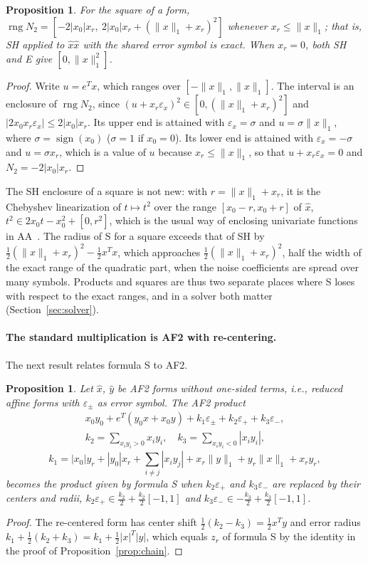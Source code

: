 \documentclass[10pt]{article}
\newtheorem{propo}[theorem]{Proposition}
\theoremstyle{definition}
\newcommand{\eps}{\varepsilon}
\newcommand{\ex}{\eps_x}
\newcommand{\rng}{\operatorname{rng}}
\begin{document}
\begin{propo}
\label{prop:square}
For the square of a form, $\rng N_2 = [-2|x_0|x_r,\ 2|x_0|x_r+(\|x\|_1+x_r)^2]$ whenever $x_r\le\|x\|_1$; that is, SH applied to $\hat x\hat x$ with the shared error symbol is exact. When $x_r=0$, both SH and E give $[0,\|x\|_1^2]$.
\end{propo}
\begin{proof}
Write $u=e^Tx$, which ranges over $[-\|x\|_1,\|x\|_1]$. The interval is an enclosure of $\rng N_2$, since $(u+x_r\ex)^2\in[0,(\|x\|_1+x_r)^2]$ and $|2x_0x_r\ex|\le2|x_0|x_r$. Its upper end is attained with $\ex=\sigma$ and $u=\sigma\|x\|_1$, where $\sigma=\operatorname{sign}(x_0)$ ($\sigma=1$ if $x_0=0$). Its lower end is attained with $\ex=-\sigma$ and $u=\sigma x_r$, which is a value of $u$ because $x_r\le\|x\|_1$, so that $u+x_r\ex=0$ and $N_2=-2|x_0|x_r$.
\end{proof}
The SH enclosure of a square is not new: with $r=\|x\|_1+x_r$, it is the Chebyshev linearization of $t\mapsto t^2$ over the range $[x_0-r,x_0+r]$ of $\hat x$, $t^2\in 2x_0t-x_0^2+[0,r^2]$, which is the usual way of enclosing univariate functions in AA~\cite{stolfi1997self}. The radius of S for a square exceeds that of SH by $\tfrac12(\|x\|_1+x_r)^2-\tfrac12x^Tx$, which approaches $\tfrac12(\|x\|_1+x_r)^2$, half the width of the exact range of the quadratic part, when the noise coefficients are spread over many symbols. Products and squares are thus two separate places where S loses with respect to the exact ranges, and in a solver both matter (Section~\ref{sec:solver}).

\paragraph{The standard multiplication is AF2 with re-centering.} The next result relates formula S to AF2.

\begin{propo}
\label{prop:af2}
Let $\hat x$, $\hat y$ be AF2 forms without one-sided terms, i.e., reduced affine forms with $\eps_\pm$ as error symbol. The AF2 product~\cite{messine2002extentions}
\[
\begin{gathered}x_0y_0 + e^T(y_0x+x_0y) + k_1\eps_\pm + k_2\eps_+ + k_3\eps_-,\\ k_2=\sum_{x_iy_i>0}x_iy_i,\quad k_3=\sum_{x_iy_i<0}|x_iy_i|,\end{gathered}
\]
\[
k_1 = |x_0|y_r+|y_0|x_r+\sum_{i\ne j}|x_iy_j| + x_r\|y\|_1+y_r\|x\|_1+x_ry_r,
\]
becomes the product given by formula S when $k_2\eps_+$ and $k_3\eps_-$ are replaced by their centers and radii, $k_2\eps_+\in \tfrac{k_2}{2}+\tfrac{k_2}{2}[-1,1]$ and $k_3\eps_-\in-\tfrac{k_3}{2}+\tfrac{k_3}{2}[-1,1]$.
\end{propo}
\begin{proof}
The re-centered form has center shift $\tfrac12(k_2-k_3)=\tfrac12x^Ty$ and error radius $k_1+\tfrac12(k_2+k_3) = k_1+\tfrac12|x|^T|y|$, which equals $z_r$ of formula S by the identity in the proof of Proposition~\ref{prop:chain}.
\end{proof}
\end{document}
